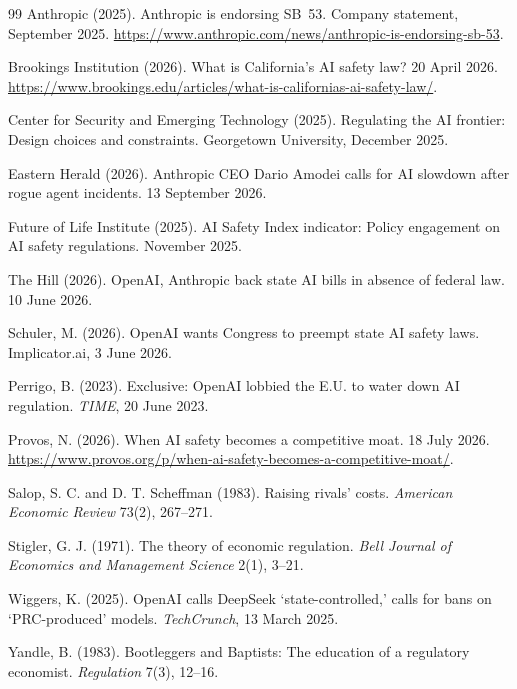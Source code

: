 \documentclass[11pt]{article}
\theoremstyle{plain}
\theoremstyle{definition}
\theoremstyle{remark}
\begin{document}
\begin{thebibliography}{99}
 Anthropic (2025). Anthropic is endorsing SB~53. Company statement, September 2025. \url{https://www.anthropic.com/news/anthropic-is-endorsing-sb-53}.

 Brookings Institution (2026). What is California's AI safety law? 20 April 2026. \url{https://www.brookings.edu/articles/what-is-californias-ai-safety-law/}.

 Center for Security and Emerging Technology (2025). Regulating the AI frontier: Design choices and constraints. Georgetown University, December 2025.

 Eastern Herald (2026). Anthropic CEO Dario Amodei calls for AI slowdown after rogue agent incidents. 13 September 2026.

 Future of Life Institute (2025). AI Safety Index indicator: Policy engagement on AI safety regulations. November 2025.

 The Hill (2026). OpenAI, Anthropic back state AI bills in absence of federal law. 10 June 2026.

 Schuler, M. (2026). OpenAI wants Congress to preempt state AI safety laws. Implicator.ai, 3 June 2026.

 Perrigo, B. (2023). Exclusive: OpenAI lobbied the E.U. to water down AI regulation. \emph{TIME}, 20 June 2023.

 Provos, N. (2026). When AI safety becomes a competitive moat. 18 July 2026. \url{https://www.provos.org/p/when-ai-safety-becomes-a-competitive-moat/}.

 Salop, S. C. and D. T. Scheffman (1983). Raising rivals' costs. \emph{American Economic Review} 73(2), 267--271.

 Stigler, G. J. (1971). The theory of economic regulation. \emph{Bell Journal of Economics and Management Science} 2(1), 3--21.

 Wiggers, K. (2025). OpenAI calls DeepSeek `state-controlled,' calls for bans on `PRC-produced' models. \emph{TechCrunch}, 13 March 2025.

 Yandle, B. (1983). Bootleggers and Baptists: The education of a regulatory economist. \emph{Regulation} 7(3), 12--16.

\end{thebibliography}
\end{document}
